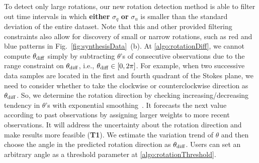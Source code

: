 %
To detect only large rotations, 
our new rotation detection method is able to filter out time intervals in which \textbf{either} $\sigma_{q}$ \textbf{or} $ \sigma_{u}$ is smaller than the standard deviation of the entire dataset. %
Note that this and other provided filtering constraints also allow for discovery of small or narrow rotations, such as red and blue patterns in Fig.~\ref{fig:synthesisData}~(b).
%
At \ref{algo:rotationDiff}, we cannot compute $\theta_{\rm diff}$ simply by subtracting $\theta$'s of consecutive observations 
due to the range constraint on $\theta_{\rm diff}$, i.e., $\theta_{\rm diff} \in [0, 2\pi]$. 
For example, when two successive data samples are located in the first and fourth quadrant of the Stokes plane, 
we need to consider whether to take the clockwise or counterclockwise direction as $\theta_{\rm diff}$. 
So, we determine the rotation direction 
by checking increasing/decreasing tendency in $\theta$'s with exponential smoothing~\cite{Brown1956}.
It forecasts the next value according to past observations by assigning larger weights to more recent observations.
It will address the uncertainty about the rotation direction and make results more feasible (\textbf{T1}).
We estimate the variation trend of $\theta$ and
then choose the angle in the predicted rotation direction as $\theta_{\rm diff}$.
Users can set an arbitrary angle as a threshold parameter at \ref{algo:rotationThreshold}.

